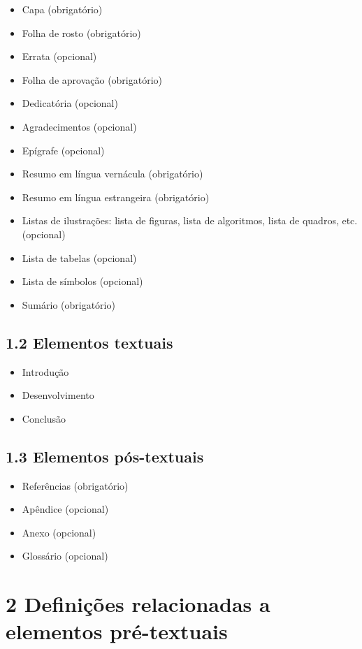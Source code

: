 \documentclass[
	12pt,				%
	oneside,			%
	a4paper,			%
	english,			%
	brazil				%
	]{abntex2ppgsi}
\begin{document}
\begin{anexosenv}
\begin{itemize}
	\item Capa (obrigatório)
	\item	Folha de rosto (obrigatório)
	\item	Errata (opcional)
	\item	Folha de aprovação (obrigatório)
	\item	Dedicatória (opcional)
	\item	Agradecimentos (opcional)
	\item	Epígrafe (opcional)
	\item	Resumo em língua vernácula (obrigatório)
	\item	Resumo em língua estrangeira (obrigatório)
	\item	Listas de ilustrações: lista de figuras, lista de algoritmos, lista de quadros, etc. (opcional)
	\item	Lista de tabelas (opcional)
	\item	Lista de símbolos (opcional)
	\item	Sumário (obrigatório)
\end{itemize}

\subsection*{1.2 Elementos textuais}

\begin{itemize}
	\item	Introdução
	\item	Desenvolvimento
	\item	Conclusão
\end{itemize}

\subsection*{1.3 Elementos pós-textuais}

\begin{itemize}
	\item	Referências (obrigatório)
	\item	Apêndice (opcional)
	\item	Anexo (opcional)
	\item	Glossário (opcional)
\end{itemize}

\section*{2 Definições relacionadas a elementos pré-textuais}


\end{anexosenv}
\end{document}
